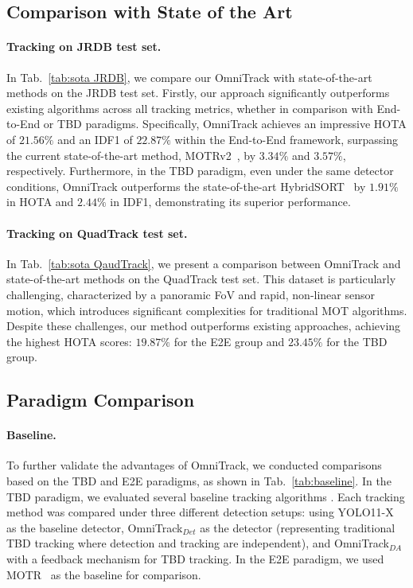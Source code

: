 \subsection{Comparison with State of the Art}
\paragraph{Tracking on JRDB test set.} 
In Tab.~\ref{tab:sota JRDB}, we compare our OmniTrack with state-of-the-art methods on the JRDB test set. Firstly, our approach significantly outperforms existing algorithms across all tracking metrics, whether in comparison with End-to-End or TBD paradigms. Specifically, OmniTrack achieves an impressive HOTA of $21.56\%$ and an IDF1 of $22.87\%$ within the End-to-End framework, surpassing the current state-of-the-art method, MOTRv2~\cite{zhang2023motrv2}, by $3.34\%$ and $3.57\%$, respectively. Furthermore, in the TBD paradigm, even under the same detector conditions, OmniTrack outperforms the state-of-the-art HybridSORT~\cite{yang2024hybrid} by $1.91\%$ in HOTA and $2.44\%$ in IDF1, demonstrating its superior performance.

\vspace{-3mm}
\paragraph{Tracking on QuadTrack test set.}
%

In Tab.~\ref{tab:sota QaudTrack}, we present a comparison between OmniTrack and state-of-the-art methods on the QuadTrack test set. This dataset is particularly challenging, characterized by a panoramic FoV and rapid, non-linear sensor motion, which introduces significant complexities for traditional MOT algorithms. Despite these challenges, our method outperforms existing approaches, achieving the highest HOTA scores: $19.87\%$ for the E2E group and $23.45\%$ for the TBD group. 
%

\subsection{Paradigm Comparison}
\paragraph{Baseline.}
To further validate the advantages of OmniTrack, we conducted comparisons based on the TBD and E2E paradigms, as shown in Tab.~\ref{tab:baseline}.
In the TBD paradigm, we evaluated several baseline tracking algorithms \cite{bewley2016simple,zhang2022bytetrack,cao2023observation,yang2024hybrid}. Each tracking method was compared under three different detection setups: using YOLO11-X~\cite{yolo11} as the baseline detector, OmniTrack\(_{Det}\) as the detector (representing traditional TBD tracking where detection and tracking are independent), and OmniTrack\(_{DA}\) with a feedback mechanism for TBD tracking. In the E2E paradigm, we used MOTR~\cite{zeng2022motr} as the baseline for comparison.

